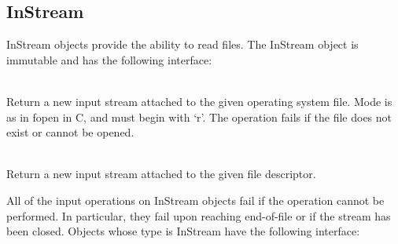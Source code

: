 \subsection{InStream}
\label{builtin instream}
InStream objects provide the ability to read files.  The InStream object is
immutable and has the following interface:

\begin{desc}
  \item[\kw{operation} fromUnix\/\LB{}fn \CO{} \tn{String}, mode \CO{} \tn{String}\/\RB{} \returns{} \/\LB{}InStream\/\RB{}]~\\
    Return a new input stream attached to the given operating system file.
    Mode is as in fopen in C, and must begin with `r'.
    The operation fails if the file does not exist or cannot be opened.
  \item[\kw{operation} create\/\LB{}file \CO{} \tn{Integer}\/\RB{} \returns{} \/\LB{}InStream\/\RB{}]~\\
    Return a new input stream attached to the given file descriptor.
\end{desc}

\noindent
All of the input operations on InStream objects fail if the operation cannot
be performed.  In particular, they fail upon reaching end-of-file or if the
stream has been closed.
Objects whose type is InStream have the following interface:

